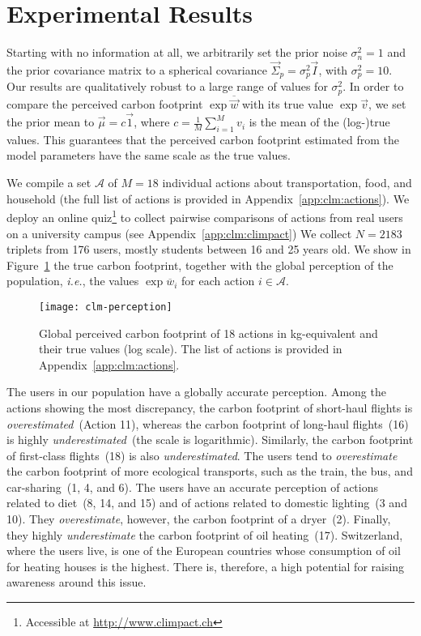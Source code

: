 \section{Experimental Results}
\label{clm:sec:results}

Starting with no information at all, we arbitrarily set the prior noise $\sigma_n^{2} = 1$ and the prior covariance matrix to a spherical covariance $\vec{\Sigma}_p = \sigma_p^{2} \vec{I}$, with $\sigma_p^{2} = 10$.
Our results are qualitatively robust to a large range of values for $\sigma_p^{2}$.
In order to compare the perceived carbon footprint $\exp \overline{\vec{w}}$ with its true value $\exp \vec{v}$, we set the prior mean to $\vec{\mu} = c \vec{1}$, where $ c = \frac{1}{M}\sum_{i=1}^M v_i$ is the mean of the (log-)true values.
This guarantees that the perceived carbon footprint estimated from the model parameters have the same scale as the true values.

We compile a set $\mathcal{A}$ of $M=18$ individual actions about transportation, food, and household (the full list of actions is provided in Appendix~\ref{app:clm:actions}).
We deploy an online quiz\footnote{Accessible at \url{http://www.climpact.ch}} to collect pairwise comparisons of actions from real users on a university campus (see Appendix~\ref{app:clm:climpact})
We collect $N=2183$ triplets from 176 users, mostly students between 16 and 25 years old.
We show in Figure~\ref{clm:fig:perception} the true carbon footprint, together with the global perception of the population, \textit{i.e.}, the values $\exp \overline{w}_i$ for each action $i \in \mathcal{A}$.

\begin{figure}
	\centering
	\texttt{[image: clm-perception]}
	\caption{Global perceived carbon footprint of 18 actions in kg\COtwo-equivalent and their true values (log scale).
		The list of actions is provided in Appendix~\ref{app:clm:actions}.}%
	\label{clm:fig:perception}
\end{figure}

The users in our population have a globally accurate perception.
Among the actions showing the most discrepancy, the carbon footprint of short-haul flights is \textit{overestimated}~(Action 11), whereas the carbon footprint of long-haul flights~(16) is highly \textit{underestimated}~(the scale is logarithmic).
Similarly, the carbon footprint of first-class flights~(18) is also \textit{underestimated}.
The users tend to \textit{overestimate} the carbon footprint of more ecological transports, such as the train, the bus, and car-sharing~(1, 4, and 6).
The users have an accurate perception of actions related to diet~(8, 14, and 15) and of actions related to domestic lighting~(3 and 10).
They \textit{overestimate}, however, the carbon footprint of a dryer~(2).
Finally, they highly \textit{underestimate} the carbon footprint of oil heating~(17).
Switzerland, where the users live, is one of the European countries whose consumption of oil for heating houses is the highest.
There is, therefore, a high potential for raising awareness around this issue.
